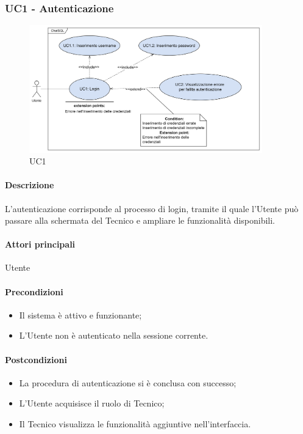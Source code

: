 \subsubsection{UC1 - Autenticazione}\label{UC1}

\begin{figure}[H]
  \centering
  \includegraphics[width=0.90\textwidth]{assets/uc1.png}
  \caption{UC1}
\end{figure}

\paragraph*{Descrizione}
L'autenticazione corrisponde al processo di login, tramite il quale l'Utente può passare alla schermata del Tecnico e ampliare le funzionalità disponibili.

\paragraph*{Attori principali}
Utente

\paragraph*{Precondizioni}
\begin{itemize}
  \item Il sistema è attivo e funzionante;
  \item L'Utente non è autenticato nella sessione corrente.
\end{itemize}

\paragraph*{Postcondizioni}
\begin{itemize}
  \item La procedura di autenticazione si è conclusa con successo;
  \item L'Utente acquisisce il ruolo di Tecnico;
  \item Il Tecnico visualizza le funzionalità aggiuntive nell'interfaccia.  
\end{itemize}

